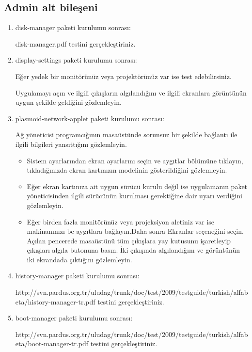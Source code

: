 \documentclass[a4paper,10pt]{article}
\begin{document}
\subsection*{Admin alt bileşeni}
\begin{enumerate} 
\item disk-manager paketi kurulumu sonrası:

disk-manager.pdf testini gerçekleştiriniz.
% 
\item display-settings paketi kurulumu sonrası:
  
Eğer yedek bir monitörünüz veya projektörünüz var ise test edebilirsiniz.

Uygulamayı açın ve ilgili çıkışların algılandığını ve ilgili ekranlara görüntünün uygun şekilde geldiğini gözlemleyin.

\item plasmoid-network-applet paketi kurulumu sonrası:

Ağ yöneticisi programcığının masaüstünde sorunsuz bir şekilde bağlantı ile ilgili bilgileri yansıttığını gözlemleyin.

\begin{itemize}
\item Sistem ayarlarından ekran ayarlarını seçin ve aygıtlar bölümüne tıklayın, tıkladığınızda ekran kartınızın modelinin gösterildiğini gözlemleyin.

\item Eğer ekran kartınıza ait uygun sürücü kurulu değil ise uygulamanın paket yöneticisinden ilgili sürücünün kurulması gerektiğine dair uyarı verdiğini gözlemleyin.

\item Eğer birden fazla monitörünüz veya projeksiyon aletiniz var ise makinanınızı be aygıtlara bağlayın.Daha sonra Ekranlar seçeneğini seçin. Açılan pencerede masaüstünü tüm çıkışlara yay kutusunu işaretleyip çıkışları algıla butonuna basın. İki çıkışında algılandığını ve görüntünün iki ekrandada çıktığını gözlemleyin. 
\end{itemize}

 \item history-manager paketi kurulumu sonrası:

 http://svn.pardus.org.tr/uludag/trunk/doc/test/2009/testguide/turkish/alfabeta/history-manager-tr.pdf  testini gerçekleştiriniz.

\item boot-manager paketi kurulumu sonrası:

 http://svn.pardus.org.tr/uludag/trunk/doc/test/2009/testguide/turkish/alfabeta/boot-manager-tr.pdf  testini gerçekleştiriniz.



\end{enumerate}
\end{document}
